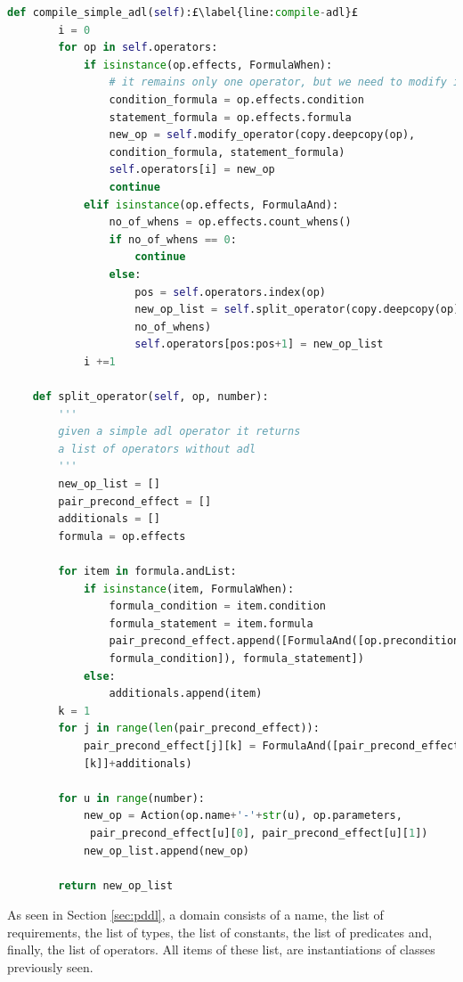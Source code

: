 \begin{lstlisting}[language=Python, style=Python, escapechar = £,  label={code:fond-dom}, caption={The \texttt{Domain} class.}]
    def compile_simple_adl(self):£\label{line:compile-adl}£
        i = 0
        for op in self.operators:
            if isinstance(op.effects, FormulaWhen):
                # it remains only one operator, but we need to modify it
                condition_formula = op.effects.condition
                statement_formula = op.effects.formula
                new_op = self.modify_operator(copy.deepcopy(op),
                condition_formula, statement_formula)
                self.operators[i] = new_op
                continue
            elif isinstance(op.effects, FormulaAnd):
                no_of_whens = op.effects.count_whens()
                if no_of_whens == 0:
                    continue
                else:
                    pos = self.operators.index(op)
                    new_op_list = self.split_operator(copy.deepcopy(op),
                    no_of_whens)
                    self.operators[pos:pos+1] = new_op_list
            i +=1

    def split_operator(self, op, number):
        '''
        given a simple adl operator it returns
        a list of operators without adl
        '''
        new_op_list = []
        pair_precond_effect = []
        additionals = []
        formula = op.effects

        for item in formula.andList:
            if isinstance(item, FormulaWhen):
                formula_condition = item.condition
                formula_statement = item.formula
                pair_precond_effect.append([FormulaAnd([op.preconditions,
                formula_condition]), formula_statement])
            else:
                additionals.append(item)
        k = 1
        for j in range(len(pair_precond_effect)):
            pair_precond_effect[j][k] = FormulaAnd([pair_precond_effect[j]
            [k]]+additionals)

        for u in range(number):
            new_op = Action(op.name+'-'+str(u), op.parameters,
             pair_precond_effect[u][0], pair_precond_effect[u][1])
            new_op_list.append(new_op)

        return new_op_list
\end{lstlisting}
As seen in Section \ref{sec:pddl}, a \PDDL domain consists of a name,
the list of requirements, the list of types, the list of constants, the list of predicates and, finally, the list of operators. All items of these list, are instantiations of classes previously seen.
